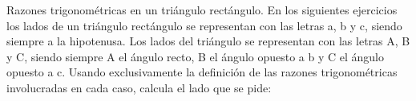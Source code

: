 \documentclass[spanish, 11pt]{exam}
\begin{document}
\begin{questions}
\begin{multicols}{2}
\begin{parts}
\end{parts}
\end{multicols}






\question Razones trigonométricas en un triángulo rectángulo. En los siguientes ejercicios los lados de un triángulo
rectángulo se representan con las letras a, b y c, siendo siempre a la hipotenusa. Los lados del triángulo se
representan con las letras A, B y C, siendo siempre A el ángulo recto, B el ángulo opuesto a b y C el ángulo
opuesto a c. Usando exclusivamente la definición de las razones trigonométricas involucradas en cada caso,
calcula el lado que se pide:
\begin{multicols}{2}
\end{multicols}
\end{questions}
\end{document}
